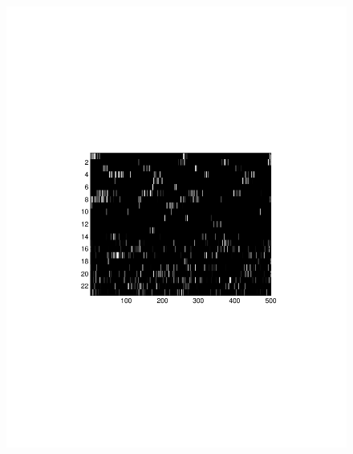 \begin{figure}[h]
\begin{minipage}[c]{0.45\hsize}
\includegraphics[width=\hsize]{../figs/FigureA11_real_raster}
\end{minipage}
\begin{minipage}[c]{0.3\hsize}

\end{minipage}
\end{figure}
